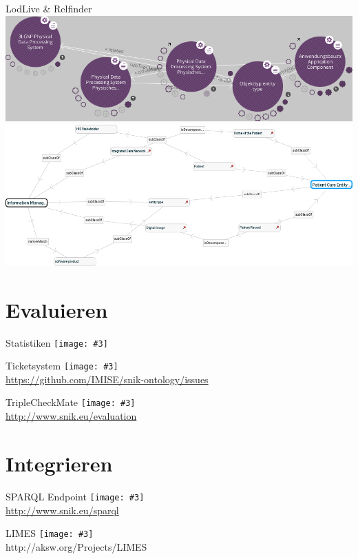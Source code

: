 \documentclass{beamer}
\newcommand{\imageslide}[3][]
{
\begin{frame}{#2}
\centering\texttt{[image: \#3]}
\\#1
\end{frame}
}
\begin{document}
\begin{frame}{LodLive \& Relfinder}
\centering
\includegraphics[width=\textwidth]{img/lodlive.png}\\
\includegraphics[width=\textwidth]{img/relfinder.png}
\end{frame}

\section{Evaluieren}

\imageslide{Statistiken}{img/dashboard-medley.png}
\imageslide[\url{https://github.com/IMISE/snik-ontology/issues}]{Ticketsystem}{img/gitissue.png}
\imageslide[\url{http://www.snik.eu/evaluation}]{TripleCheckMate}{img/triplecheckmate.png}

\section{Integrieren}

\imageslide[\url{http://www.snik.eu/sparql}]{SPARQL Endpoint}{img/sparqlresult.png}

\imageslide[http://aksw.org/Projects/LIMES]{LIMES}{img/limes.png}

\end{document}
